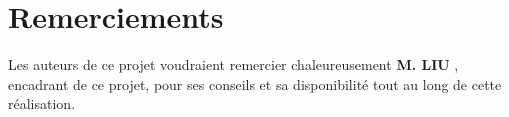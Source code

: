 \documentclass[11pt, french]{article}
\begin{document}


\tableofcontents
\listoffigures
\listoftables


\newpage
\section* {Remerciements}
Les auteurs de ce projet voudraient remercier chaleureusement
\textbf{M. LIU }, encadrant de ce projet, pour
ses conseils et sa disponibilité tout au long de cette réalisation.








\newpage


\nocite{*}
\end{document}
